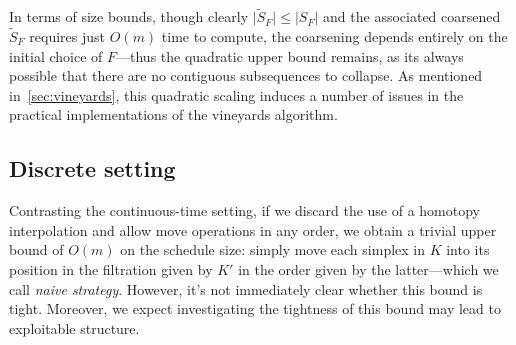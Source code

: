 \documentclass[sn-mathphys]{sn-jnl}
\begin{document}
\noindent 
In terms of size bounds, though clearly $\lvert \widetilde{S}_F \rvert \leq \lvert S_F \rvert$ and the associated coarsened $\widetilde{S}_F$ requires just $O(m)$ time to compute, the coarsening depends entirely on the initial choice of $F$---thus the quadratic upper bound remains, as its always possible that there are no contiguous subsequences to collapse. 
As mentioned in~\ref{sec:vineyards}, this quadratic scaling induces a number of issues in the practical implementations of the vineyards algorithm.



\subsection{Discrete setting}\label{sec:moves_setting}


Contrasting the continuous-time setting, if we discard the use of a homotopy interpolation and allow move operations in any order, we obtain a trivial upper bound of $O(m)$ on the schedule size:  simply move each simplex in $K$ into its position in the filtration given by $K'$ in the order given by the latter---which we call \emph{naive strategy}. However, it's not immediately clear whether this bound is tight. Moreover, we expect  investigating the tightness of this bound may lead to exploitable structure. 
\end{document}
